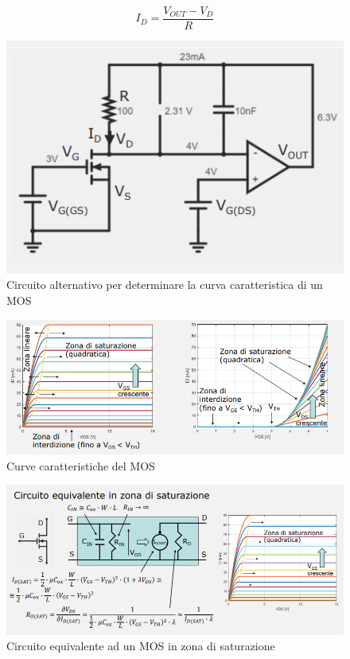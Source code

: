 \documentclass{article}
\begin{document}
\[I_D = \frac{V_{OUT} - V_D}{R}\]
\clearpage
\begin{figure}[h]
  \centering
  \includegraphics[scale=0.55]{IM_determinazione_MOS_bis}
  \caption{Circuito alternativo per determinare la curva caratteristica di un MOS}
  \label{Schema_determinazione_MOS_bis}
\end{figure}

\begin{figure}[h]
  \centering
  \includegraphics[scale=0.55]{IM_MOS_grafici_bis}
  \caption{Curve caratteristiche del MOS}
  \label{Schema_MOS_grafici_bis}
\end{figure}

\begin{figure}[h!]
  \centering
  \includegraphics[scale=0.55]{IM_MOS_equivalente_saturazione}
  \caption{Circuito equivalente ad un MOS in zona di saturazione}
  \label{Schema_MOS_equivalente_saturazione}
\end{figure}
\end{document}
